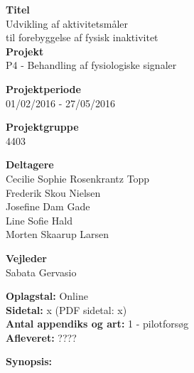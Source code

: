 \begin{minipage}[t]{0.48\textwidth}
\textbf{Titel} \\[5pt]\hspace*{2ex} 
Udvikling af aktivitetsmåler\\\hspace*{2ex}
til forebyggelse af fysisk inaktivitet\\


\textbf{Projekt} \\[5pt]\hspace*{2ex} 
P4 - Behandling af fysiologiske signaler\\\hspace*{2ex}


\textbf{Projektperiode} \\[5pt]\bigskip\hspace{2ex}
01/02/2016 - 27/05/2016

\textbf{Projektgruppe} \\[5pt]\bigskip\hspace{2ex}
4403

\textbf{Deltagere} \\[5pt]\hspace*{2ex}
Cecilie Sophie Rosenkrantz Topp \\\hspace*{2ex}
Frederik Skou Nielsen \\\hspace*{2ex}
Josefine Dam Gade \\\hspace*{2ex}
Line Sofie Hald \\\hspace*{2ex}
Morten Skaarup Larsen \\\bigskip\hspace{2ex}


\textbf{Vejleder} \\[5pt]\hspace*{2ex}
Sabata Gervasio \\\bigskip\hspace{2ex}


\vspace*{1cm}

\textbf{Oplagstal:} Online \\
\textbf{Sidetal:} x (PDF sidetal: x) \\
\textbf{Antal appendiks og art:} 1 - pilotforsøg \\ 
\textbf{Afleveret:} ????

\end{minipage}
\hfill
\begin{minipage}[t]{0.483\textwidth}
\textbf{Synopsis:} \\[5pt]
\fbox{\parbox{7cm}{\bigskip\bigskip}}
\end{minipage}

